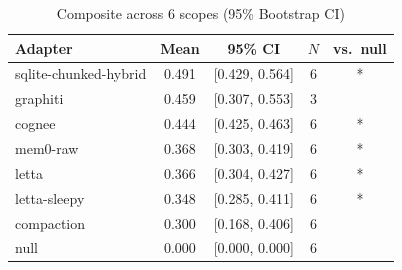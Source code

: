\begin{table}[t]
\centering
\caption{Composite across 6 scopes (95\% Bootstrap CI)}
\label{tab:main_results}
\begin{tabular}{lcccc}
\toprule
Adapter & Mean & 95\% CI & $N$ & vs.\ null \\
\midrule
  sqlite-chunked-hybrid & 0.491 & [0.429, 0.564] & 6 & * \\
  graphiti & 0.459 & [0.307, 0.553] & 3 &  \\
  cognee & 0.444 & [0.425, 0.463] & 6 & * \\
  mem0-raw & 0.368 & [0.303, 0.419] & 6 & * \\
  letta & 0.366 & [0.304, 0.427] & 6 & * \\
  letta-sleepy & 0.348 & [0.285, 0.411] & 6 & * \\
  compaction & 0.300 & [0.168, 0.406] & 6 &  \\
  null & 0.000 & [0.000, 0.000] & 6 &  \\
\bottomrule
\end{tabular}
\end{table}